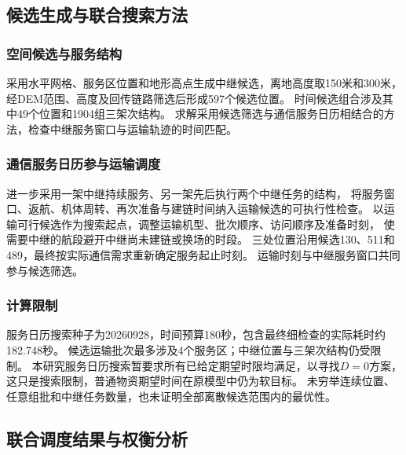 \subsection{候选生成与联合搜索方法}
\subsubsection{空间候选与服务结构}
采用水平网格、服务区位置和地形高点生成中继候选，离地高度取150米和300米，
经DEM范围、高度及回传链路筛选后形成597个候选位置。
时间候选组合涉及其中49个位置和1904组三架次结构。
求解采用候选筛选与通信服务日历相结合的方法，检查中继服务窗口与运输轨迹的时间匹配。

\subsubsection{通信服务日历参与运输调度}
进一步采用一架中继持续服务、另一架先后执行两个中继任务的结构，
将服务窗口、返航、机体周转、再次准备与建链时间纳入运输候选的可执行性检查。
以运输可行候选作为搜索起点，调整运输机型、批次顺序、访问顺序及准备时刻，
使需要中继的航段避开中继尚未建链或换场的时段。
三处位置沿用候选130、511和489，最终按实际通信需求重新确定服务起止时刻。
运输时刻与中继服务窗口共同参与候选筛选。

\subsubsection{计算限制}
服务日历搜索种子为20260928，时间预算180秒，包含最终细检查的实际耗时约182.748秒。
候选运输批次最多涉及4个服务区；中继位置与三架次结构仍受限制。
本研究服务日历搜索暂要求所有已给定期望时限均满足，以寻找$D=0$方案，
这只是搜索限制，普通物资期望时间在原模型中仍为软目标。
未穷举连续位置、任意组批和中继任务数量，也未证明全部离散候选范围内的最优性。

\subsection{联合调度结果与权衡分析}
